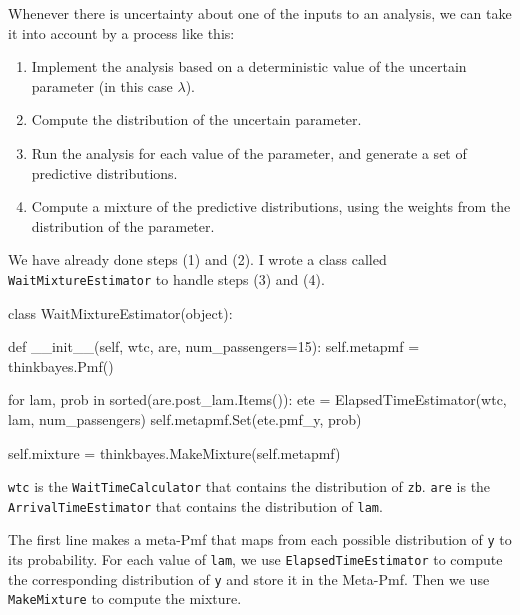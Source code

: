 \documentclass[12pt]{book}
\theoremstyle{exercise}
\begin{document}
Whenever there is uncertainty about one of the inputs to an analysis,
we can take it into account by a process like this:

\begin{enumerate}

\item Implement the analysis based on a deterministic value of the
  uncertain parameter (in this case $\lambda$).

\item Compute the distribution of the uncertain parameter.

\item Run the analysis for each value of the parameter, and generate a
  set of predictive distributions.

\item Compute a mixture of the predictive distributions, using the
  weights from the distribution of the parameter.

\end{enumerate}

We have already done steps (1) and (2).  I wrote a class
called {\tt WaitMixtureEstimator} to handle steps (3) and (4).

\begin{code}
class WaitMixtureEstimator(object):

    def __init__(self, wtc, are, num_passengers=15):
        self.metapmf = thinkbayes.Pmf()

        for lam, prob in sorted(are.post_lam.Items()):
            ete = ElapsedTimeEstimator(wtc, lam, num_passengers)
            self.metapmf.Set(ete.pmf_y, prob)

        self.mixture = thinkbayes.MakeMixture(self.metapmf)
\end{code}

{\tt wtc} is the {\tt WaitTimeCalculator} that contains the
distribution of {\tt zb}.  {\tt are} is the {\tt ArrivalTimeEstimator}
that contains the distribution of {\tt lam}.

The first line makes a meta-Pmf that maps from each possible
distribution of {\tt y} to its probability.  For each value
of {\tt lam}, we use {\tt ElapsedTimeEstimator} to
compute the corresponding distribution of
{\tt y} and store it in the Meta-Pmf.  Then
we use {\tt MakeMixture} to compute the mixture.

\end{document}
